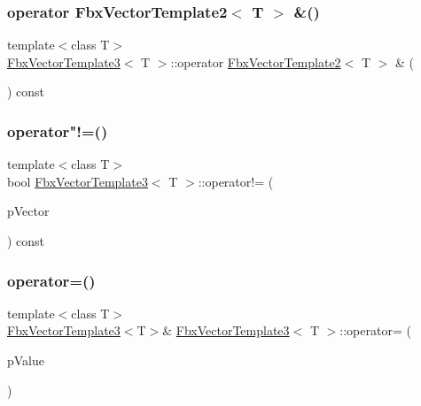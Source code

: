 \mbox{\label{class_fbx_vector_template3_ae3592b0f562df1272dc844f451cb0111}} 
\subsubsection{\texorpdfstring{operator Fbx\+Vector\+Template2$<$ T $>$ \&()}{operator FbxVectorTemplate2< T > \&()}}
{\footnotesize\ttfamily template$<$class T$>$ \\
\hyperlink{class_fbx_vector_template3}{Fbx\+Vector\+Template3}$<$ T $>$\+::operator \hyperlink{class_fbx_vector_template2}{Fbx\+Vector\+Template2}$<$ T $>$ \& (\begin{DoxyParamCaption}{ }\end{DoxyParamCaption}) const}

\mbox{\label{class_fbx_vector_template3_acf6fb2023f555ec2912566031918aa31}} 
\subsubsection{\texorpdfstring{operator"!=()}{operator!=()}}
{\footnotesize\ttfamily template$<$class T$>$ \\
bool \hyperlink{class_fbx_vector_template3}{Fbx\+Vector\+Template3}$<$ T $>$\+::operator!= (\begin{DoxyParamCaption}\item[{const \hyperlink{class_fbx_vector_template3}{Fbx\+Vector\+Template3}$<$ T $>$ \&}]{p\+Vector }\end{DoxyParamCaption}) const}

\mbox{\label{class_fbx_vector_template3_aed9997cebee8c4bfeef05b433de743ec}} 
\subsubsection{\texorpdfstring{operator=()}{operator=()}\hspace{0.1cm}{\footnotesize\ttfamily [1/3]}}
{\footnotesize\ttfamily template$<$class T$>$ \\
\hyperlink{class_fbx_vector_template3}{Fbx\+Vector\+Template3}$<$T$>$\& \hyperlink{class_fbx_vector_template3}{Fbx\+Vector\+Template3}$<$ T $>$\+::operator= (\begin{DoxyParamCaption}\item[{T const \&}]{p\+Value }\end{DoxyParamCaption})}

